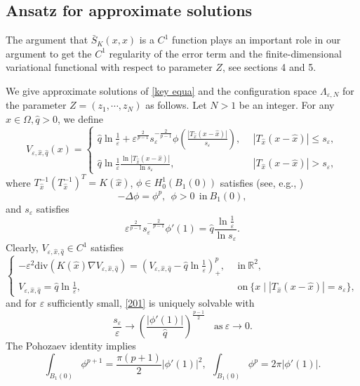 \documentclass[12pt,reqno]{amsart}
\numberwithin{equation}{section}
\theoremstyle{definition}
\theoremstyle{remark}
\begin{document}
\subsection{Ansatz for approximate solutions}

The argument that  $ \bar{S}_K(x,x)$ is a $ C^1 $  function  plays an important role in our argument to get the $ C^1 $ regularity
of the error term and the finite-dimensional variational functional with respect to parameter $ Z $, see sections 4 and 5.


We give approximate solutions of \eqref{key equa} and   the configuration space $ \Lambda_{\varepsilon, N} $ for the parameter $ Z=(z_1,\cdots,z_N) $  as follows. Let $ N> 1 $ be an integer.  For any $ \hat{x}\in \Omega, \hat{q}>0 $, we define
\begin{equation}\label{eq2-2}
V_{\varepsilon, \hat{x}, \hat{q}}(x)=\begin{cases}
\hat{q}\ln \frac{1}{\varepsilon}+\varepsilon^{\frac{2}{p-1}}s_\varepsilon^{-\frac{2}{p-1}}\phi\left(\frac{|T_{\hat{x}}(x-\hat{x})|}{s_\varepsilon}\right),\ \ &|T_{\hat{x}}(x-\hat{x})|\le s_\varepsilon,\\
 \hat{q} \ln \frac{1}{\varepsilon}\frac{\ln |T_{\hat{x}}(x-\hat{x})|}{\ln s_\varepsilon},\ \  &  |T_{\hat{x}}(x-\hat{x})|>s_\varepsilon,
\end{cases}
\end{equation}
where $ T_{\hat{x}}^{-1}\left (T_{\hat{x}}^{-1}\right )^{T}=K\left (\hat{x}\right ) $, $ \phi\in H^1_0(B_1(0)) $ satisfies (see, e.g., \cite{CLW})
\begin{equation*}
-\Delta\phi=\phi^p, \ \ \phi>0\ \ \text{in}\ B_1(0),
\end{equation*}
and $ s_\varepsilon $ satisfies
\begin{equation}\label{201}
\varepsilon^{\frac{2}{p-1}}s_\varepsilon^{-\frac{2}{p-1}}\phi'(1)=\hat{q}\frac{ \ln\frac{1}{\varepsilon}}{\ln s_\varepsilon}.
\end{equation}
Clearly, $ V_{\varepsilon, \hat{x}, \hat{q}}\in C^1 $ satisfies
\begin{equation}\label{eq2}
\begin{cases}
-\varepsilon^2\text{div}\left (K(\hat{x})\nabla V_{\varepsilon, \hat{x}, \hat{q}}\right )=  \left (V_{\varepsilon, \hat{x}, \hat{q}}-\hat{q}\ln\frac{1}{\varepsilon}\right )^{p}_+,\ \ & \text{in}\  \mathbb{R}^2,\\
V_{\varepsilon, \hat{x}, \hat{q}}=\hat{q}\ln\frac{1}{\varepsilon},\ \ &\text{on} \ \{x\mid |T_{\hat{x}}(x-\hat{x})|=s_\varepsilon\},
\end{cases}
\end{equation}
and  for $ \varepsilon $ sufficiently small, \eqref{201} is uniquely solvable with
\begin{equation*}
\frac{s_\varepsilon}{\varepsilon}\to \left( \frac{|\phi'(1)|}{\hat{q}}\right) ^{\frac{p-1}{2}}\ \ \ \ \text{as}\ \varepsilon\to0.
\end{equation*}
The Pohozaev identity implies
\begin{equation}\label{PI}
\int_{B_1(0)}\phi^{p+1}=\frac{\pi(p+1)}{2}|\phi'(1)|^2,\ \ \int_{B_1(0)}\phi^{p}= 2\pi|\phi'(1)|.
\end{equation}
\end{document}
